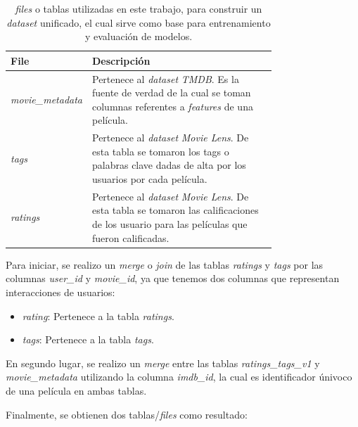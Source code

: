 \documentclass[11pt,a4paper,twoside]{thesis}
\begin{document}
\begin{table}[!htb]
	\centering
	\footnotesize
	\begin{tabular}{l | p{0.75\linewidth}}
		\hline
		File                     & Descripción                                                                                                                                              \\
		\hline
		\textit{movie\_metadata} & Pertenece al \textit{dataset} \textit{TMDB}. Es la fuente de verdad de la cual se toman columnas referentes a \textit{features} de una película.         \\
		\textit{tags}            & Pertenece al \textit{dataset} \textit{Movie Lens}. De esta tabla se tomaron los tags o palabras clave dadas de alta por los usuarios por cada película.  \\
		\textit{ratings}         & Pertenece al \textit{dataset} \textit{Movie Lens}. De esta tabla se tomaron las calificaciones de los usuario para las películas que fueron calificadas. \\
		\hline
	\end{tabular}
	\caption{
		\textit{files} o tablas utilizadas en este trabajo, para construir un \textit{dataset} unificado, el cual sirve como base para entrenamiento y evaluación de modelos.
	}
	\label{table:tableRatings}
\end{table}

Para iniciar, se realizo un \textit{merge} o \textit{join} de las tablas
\textit{ratings} y \textit{tags} por las columnas \textit{user\_id} y
\textit{movie\_id}, ya que tenemos dos columnas que representan interacciones
de usuarios:

\begin{itemize}
	\item \textit{rating}: Pertenece a la tabla \textit{ratings}.
	\item \textit{tags}: Pertenece a la tabla \textit{tags}.
\end{itemize}

En segundo lugar, se realizo un \textit{merge} entre las tablas
\textit{ratings\_tags\_v1} y \textit{movie\_metadata} utilizando la columna
\textit{imdb\_id}, la cual es identificador únivoco de una película en ambas
tablas.

Finalmente, se obtienen dos tablas/\textit{files} como resultado:
\end{document}
